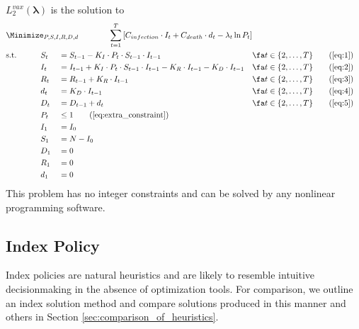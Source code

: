\documentclass{article}
\begin{document}
\begin{minipage}{\linewidth}
{
    $L_2^{vax}(\bm{\lambda})$ is the solution to\\
    \small
    \begin{alignat}{4}
        &\Minimize_{P,S,I,R,D,d}\qquad \span\span\span\span\span \sum_{t=1}^{T}\left[C_{infection}\cdot I_t + C_{death} \cdot d_t -\lambda_t \ln P_t\right]\nonumber\\
        & \text{s.t.} \qquad&& S_t &&= S_{t-1} - K_I \cdot P_t \cdot S_{t-1} \cdot I_{t-1} && \fa t \in \{2,\ldots,T\} \tag{\ref{eq:1}}\\
        & {} && I_t &&= I_{t-1} + K_I \cdot P_t \cdot S_{t-1} \cdot I_{t-1} - K_R\cdot I_{t-1} - K_D \cdot I_{t-1} && \fa t \in \{2,\ldots,T\} \tag{\ref{eq:2}}\\
        & {} && R_t &&= R_{t-1} + K_R \cdot I_{t-1} && \fa t \in \{2,\ldots,T\} \tag{\ref{eq:3}}\\
        & {} && d_t &&= K_D \cdot I_{t-1} && \fa t \in \{2,\ldots,T\} \tag{\ref{eq:4}}\\
        & {} && D_t &&= D_{t-1} + d_t && \fa t \in \{2,\ldots,T\} \tag{\ref{eq:5}}\\
        & && P_t &&\le 1 \tag{\ref{eq:extra_constraint}}\\
        & {} && I_1 &&= I_0 && \nonumber\\
        & {} && S_1 &&= N - I_0 && \nonumber\\
        & {} && D_1 &&= 0 && \nonumber\\
        & {} && R_1 &&= 0 && \nonumber\\
        & {} && d_1 &&= 0 && \nonumber
    \end{alignat}
}
This problem has no integer constraints and can be solved by any nonlinear programming software.
\end{minipage}

\subsection{Index Policy}\label{sec:heuristic_index}

Index policies are natural heuristics and are likely to resemble intuitive decisionmaking in the absence of optimization tools. For comparison, we outline an index solution method and compare solutions produced in this manner and others in Section \ref{sec:comparison_of_heuristics}.
\end{document}
